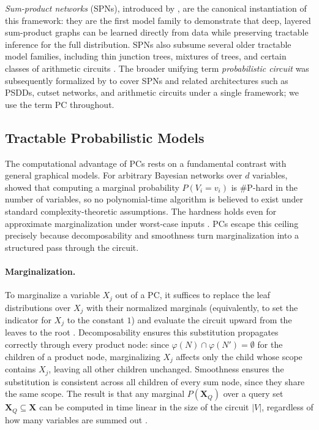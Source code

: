 \emph{Sum-product networks} (SPNs), introduced by \textcite{Poon2011SumproductNA}, are the canonical instantiation of this framework: they are the first model family to demonstrate that deep, layered sum-product graphs can be learned directly from data while preserving tractable inference for the full distribution.
SPNs also subsume several older tractable model families, including thin junction trees, mixtures of trees, and certain classes of arithmetic circuits \cite{Poon2011SumproductNA, Darwiche2000ADA}.
The broader unifying term \emph{probabilistic circuit} was subsequently formalized by \cite{Choi2020ProbabilisticCA} to cover SPNs and related architectures such as PSDDs, cutset networks, and arithmetic circuits under a single framework;
we use the term PC throughout.

\subsection*{Tractable Probabilistic Models}\label{sec:pc-tractability}
The computational advantage of PCs rests on a fundamental contrast with general graphical models.
For arbitrary Bayesian networks over $d$ variables, \cite{Roth1993OnTH} showed that computing a marginal probability $P(V_i = v_i)$ is \#P-hard in the number of variables, so no polynomial-time algorithm is believed to exist under standard complexity-theoretic assumptions.
The hardness holds even for approximate marginalization under worst-case inputs \cite{Roth1993OnTH, Cooper1990TheCC}.
PCs escape this ceiling precisely because decomposability and smoothness turn marginalization into a structured pass through the circuit.

\paragraph{Marginalization.}
To marginalize a variable $X_j$ out of a PC, it suffices to replace the leaf distributions over $X_j$ with their normalized marginals (equivalently, to set the indicator for $X_j$ to the constant $1$) and evaluate the circuit upward from the leaves to the root \cite{Darwiche2000ADA, Poon2011SumproductNA}.
Decomposability ensures this substitution propagates correctly through every product node: since $\varphi(N) \cap \varphi(N') = \emptyset$ for the children of a product node, marginalizing $X_j$ affects only the child whose scope contains $X_j$, leaving all other children unchanged.
Smoothness ensures the substitution is consistent across all children of every sum node, since they share the same scope.
The result is that any marginal $P(\mathbf{X}_Q)$ over a query set $\mathbf{X}_Q \subseteq \mathbf{X}$ can be computed in time linear in the size of the circuit $|V|$, regardless of how many variables are summed out \cite{Darwiche2000ADA}.

